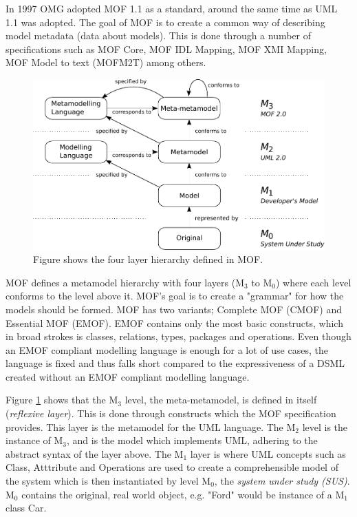 In 1997 OMG adopted MOF 1.1 as a standard, around the same time as UML 1.1 was adopted. The goal of MOF is to create a common way of describing model metadata (data about models). This is done through a number of specifications such as MOF Core, MOF IDL Mapping, MOF XMI Mapping, MOF Model to text (MOFM2T) among others.

\begin{figure}[htpb]
    \centering
    \centerline{\includegraphics[scale=0.5]{images/omg_hierarchy.pdf}}
    \caption[MOF hierarchy]{Figure shows the four layer hierarchy defined in MOF.}
    \label{fig:mof}
\end{figure}

MOF defines a metamodel hierarchy with four layers (M$_{3}$ to M$_{0}$) where each level conforms to the level above it. MOF's goal is to create a "grammar" for how the models should be formed. MOF has two variants; Complete MOF (CMOF) and Essential MOF (EMOF). EMOF contains only the most basic constructs, which in broad strokes is classes, relations, types, packages and operations. Even though an EMOF compliant modelling language is enough for a lot of use cases, the language is fixed and thus falls short compared to the expressiveness of a DSML created without an EMOF compliant modelling language.

Figure \ref{fig:mof} shows that the M$_{3}$ level, the meta-metamodel, is defined in itself (\emph{reflexive layer}). This is done through constructs which the MOF specification provides. This layer is the metamodel for the UML language. The M$_{2}$ level is the instance of M$_{3}$, and is the model which implements UML, adhering to the abstract syntax of the layer above. The M$_{1}$ layer is where UML concepts such as Class, Atttribute and Operations are used to create a comprehensible model of the system which is then instantiated by level M$_{0}$, the \emph{system under study (SUS)}. M$_{0}$ contains the original, real world object, e.g. "Ford" would be instance of a M$_{1}$ class Car.

